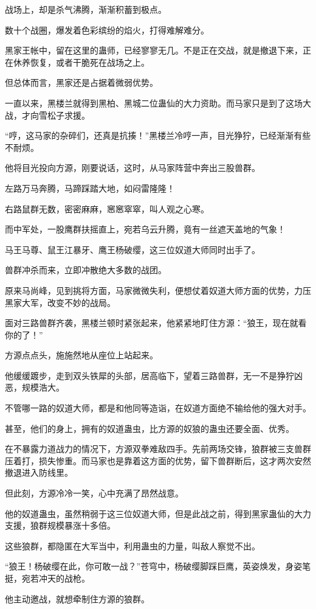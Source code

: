 \begin{this_body}
战场上，却是杀气沸腾，渐渐积蓄到极点。

数十个战圈，爆发着色彩缤纷的焰火，打得难解难分。

黑家王帐中，留在这里的蛊师，已经寥寥无几。不是正在交战，就是撤退下来，正在休养恢复，或者干脆死在战场之上。

但总体而言，黑家还是占据着微弱优势。

一直以来，黑楼兰就得到黑柏、黑城二位蛊仙的大力资助。而马家只是到了这场大战，才向雪松子求援。

“哼，这马家的杂碎们，还真是抗揍！”黑楼兰冷哼一声，目光狰狞，已经渐渐有些不耐烦。

他将目光投向方源，刚要说话，这时，从马家阵营中奔出三股兽群。

左路万马奔腾，马蹄踩踏大地，如闷雷隆隆！

右路鼠群无数，密密麻麻，窸窸窣窣，叫人观之心寒。

而中军处，一股鹰群扶摇直上，宛若乌云升腾，竟有一丝遮天盖地的气象！

马王马尊、鼠王江暴牙、鹰王杨破缨，这三位奴道大师同时出手了。

兽群冲杀而来，立即冲散绝大多数的战团。

原来马尚峰，见到挑将方面，马家微微失利，便想仗着奴道大师方面的优势，力压黑家大军，改变不妙的战局。

面对三路兽群齐袭，黑楼兰顿时紧张起来，他紧紧地盯住方源：“狼王，现在就看你的了！”

方源点点头，施施然地从座位上站起来。

他缓缓踱步，走到双头铁犀的头部，居高临下，望着三路兽群，无一不是狰狞凶恶，规模浩大。

不管哪一路的奴道大师，都是和他同等造诣，在奴道方面绝不输给他的强大对手。

甚至，他们的身上，拥有的奴道蛊虫，比方源的奴狼的蛊虫还要全面、优秀。

在不暴露力道战力的情况下，方源双拳难敌四手。先前两场交锋，狼群被三支兽群压着打，损失惨重。而马家也是靠着这方面的优势，留下兽群断后，这才两次安然撤退进入防线里。

但此刻，方源冷冷一笑，心中充满了昂然战意。

他的奴道蛊虫，虽然稍弱于这三位奴道大师，但是此战之前，得到黑家蛊仙的大力支援，狼群规模暴涨十多倍。

这些狼群，都隐匿在大军当中，利用蛊虫的力量，叫敌人察觉不出。

“狼王！杨破缨在此，你可敢一战？”苍穹中，杨破缨脚踩巨鹰，英姿焕发，身姿笔挺，宛若冲天的战枪。

他主动邀战，就想牵制住方源的狼群。


\end{this_body}
